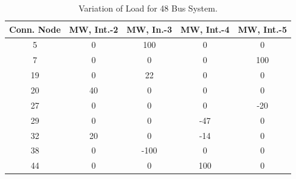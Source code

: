 \documentclass[preprint,12pt,3p]{elsarticle}
\begin{document}
	\begin{table}[ht] 
		
		\caption{Variation of Load for 48 Bus System.} %
		
		\centering %
		
		\begin{tabular}{| c | c | c | c | c |} %
			
			\hline\hline %
			
			Conn. Node & MW, Int.-2 & MW, In.-3 & MW, Int.-4  & MW, Int.-5 \\ [0.5ex] %
			
			
			\hline %
			
			5 &	0 &	100 &	0 &	0 \\ %
			\hline
			7 &	0 &	0 &	0 &	100 \\ %
			\hline
			19 &	0 &	22 &	0 &	0 \\ %
			\hline
			20 &	40 &	0 &	0 &	0 \\ %
			\hline
			27 &	0 &	0 &	0 &	-20 \\ %
			\hline
			29 &	0 &	0 &	-47 &	0 \\ %
			\hline
			32 &	20 &	0 &	-14 &	0 \\ %
			\hline
			38 &	0 &	-100 &	0 &	0 \\ %
			\hline
			44 &	0 &	0 &	100 &	0 \\ %
			\hline
		\end{tabular} 
		
		\label{table:48LASCOPFLoadModified} %
		
	\end{table}
\end{document}
